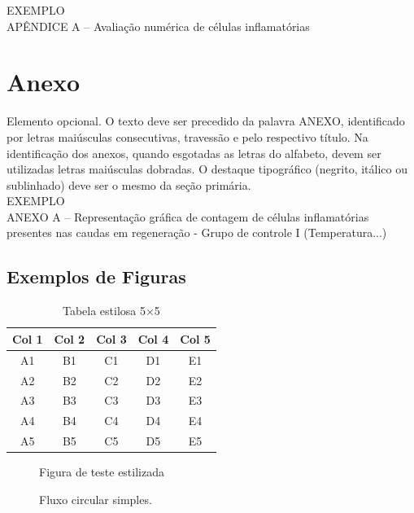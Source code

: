 \documentclass{Arquivos/TrabalhoAcademico}
\begin{document}
\noindent EXEMPLO\\[1em]

\noindent APÊNDICE A – Avaliação numérica de células inflamatórias


\inicioAnexos
\chapter{Anexo}
Elemento opcional. O texto deve ser precedido da palavra ANEXO, identificado por letras maiúsculas consecutivas, travessão e pelo respectivo título. Na identificação dos anexos, quando esgotadas as letras do alfabeto, devem ser utilizadas letras maiúsculas dobradas. O destaque tipográfico (negrito, itálico ou sublinhado) deve ser o mesmo da seção primária.\\[1em]

\noindent EXEMPLO\\[1em]

\noindent ANEXO A – Representação gráfica de contagem de células inflamatórias presentes nas caudas em
regeneração - Grupo de controle I (Temperatura...)


\section{Exemplos de Figuras}

\begin{table}[ht]
    \centering
    \caption{Tabela estilosa 5×5}
    \label{tab:estilosa}
    \begin{tabular}{ccccc}
        \toprule
        Col 1 & Col 2 & Col 3 & Col 4 & Col 5 \\
        \midrule
        A1 & B1 & C1 & D1 & E1 \\
        A2 & B2 & C2 & D2 & E2 \\
        A3 & B3 & C3 & D3 & E3 \\
        A4 & B4 & C4 & D4 & E4 \\
        A5 & B5 & C5 & D5 & E5 \\
        \bottomrule
    \end{tabular}
\end{table}

\begin{figure}[ht]
    \centering
    \caption{Figura de teste estilizada}
    \label{fig:teste-estilosa}
\end{figure}

\begin{figure}[ht]
    \centering
    \caption{Fluxo circular simples.}
    \label{fig:fluxo-simples}
\end{figure}
\end{document}
